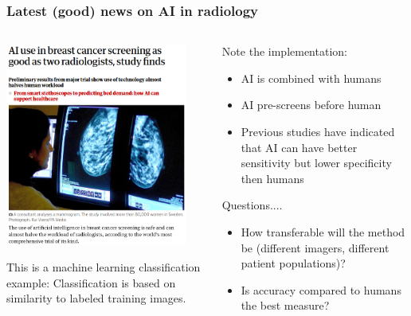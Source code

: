 \begin{frame}
\frametitle{Latest (good) news on AI in radiology}
\small
\begin{columns}[T]
    \begin{column}[T]{0.5\textwidth}
    \begin{center}
       \vspace{-5mm}
        \includegraphics[width=0.9\textwidth]{./misc_images/radiology_1}
        
    \end{center}
    \footnotesize{This is a machine learning classification example: Classification is based on similarity to labeled training images.}
        
    \end{column}


    \begin{column}{0.49\textwidth}
    
    Note the implementation:
    \begin{itemize}
    \item AI is combined with humans 
    \item AI pre-screens before human
    \item Previous studies have indicated that AI can have better sensitivity but lower specificity then humans
    \end{itemize}

    Questions....
    \begin{itemize}
    \item How transferable will the method be (different imagers, different patient populations)?
    \item Is accuracy compared to humans the best measure?
    \end{itemize}
    \end{column}
\end{columns}

\end{frame}